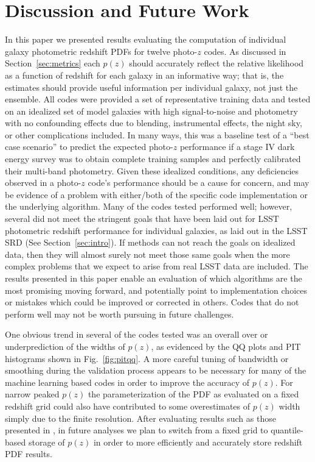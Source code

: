 \section{Discussion and Future Work}
\label{sec:discussion}
In this paper we presented results evaluating the computation of individual galaxy photometric redshift PDFs for twelve photo-$z$ codes.  As discussed in Section~\ref{sec:metrics} each $p(z)$ should accurately reflect the relative likelihood as a function of redshift for each galaxy in an informative way; that is, the estimates should provide useful information per individual galaxy, not just the ensemble.  All codes were provided a set of representative training data and tested on an idealized set of model galaxies with high signal-to-noise and photometry with no confounding effects due to blending, instrumental effects, the night sky, or other complications included.  %
In many ways, this was a baseline test of a ``best case scenario'' to predict the expected photo-$z$ performance if a stage IV dark energy survey was to obtain complete training samples and perfectly calibrated their multi-band photometry.  Given these idealized conditions, any deficiencies observed in a photo-$z$ code's performance should be a cause for concern, and may be evidence of a problem with either/both of the specific code implementation or the underlying algorithm.
Many of the codes tested performed well; however, several did not meet the stringent goals that have been laid out for LSST photometric redshift performance for individual galaxies, as laid out in the LSST SRD (See Section~\ref{sec:intro}).%
If methods can not reach the goals on idealized data, then they will almost surely not meet those same goals when the more complex problems that we expect to arise from real LSST data are included.  The results presented in this paper enable an evaluation of which algorithms are the most promising moving forward, and potentially point to implementation choices or mistakes which could be improved or corrected in others.  Codes that do not perform well may not be worth pursuing in future challenges.

One obvious trend in several of the codes tested was an overall over or underprediction of the widths of $p(z)$, as evidenced by the QQ plots and PIT histograms shown in Fig.~\ref{fig:pitqq}.  A more careful tuning of bandwidth or smoothing during the validation process appears to be necessary for many of the machine learning based codes in order to improve the accuracy of $p(z)$.  For narrow peaked $p(z)$ the parameterization of the PDF as evaluated on a fixed redshift grid could also have contributed to some overestimates of $p(z)$ width simply due to the finite resolution.  After evaluating results such as those presented in \citet[]{Malz:qp}, in future analyses we plan to switch from a fixed grid to quantile-based storage of $p(z)$ in order to more efficiently and accurately store redshift PDF results.

